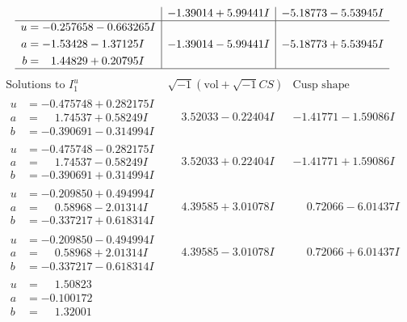 \documentclass[1p]{elsarticle_modified}
\theoremstyle{definition}
\newcommand{\I}{\sqrt{-1}}
\begin{document}
$$\begin{array}{c|c|c}
 & -1.39014 + 5.99441 I & -5.18773 - 5.53945 I \\ \hline\begin{aligned}
u &= -0.257658 - 0.663265 I \\
a &= -1.53428 - 1.37125 I \\
b &= \phantom{-}1.44829 + 0.20795 I\end{aligned}
 & -1.39014 - 5.99441 I & -5.18773 + 5.53945 I\\
 \hline 
 \end{array}$$\newpage$$\begin{array}{c|c|c}  
\text{Solutions to }I^u_{1}& \I (\text{vol} + \sqrt{-1}CS) & \text{Cusp shape}\\
 \hline 
\begin{aligned}
u &= -0.475748 + 0.282175 I \\
a &= \phantom{-}1.74537 + 0.58249 I \\
b &= -0.390691 - 0.314994 I\end{aligned}
 & \phantom{-}3.52033 - 0.22404 I & -1.41771 - 1.59086 I \\ \hline\begin{aligned}
u &= -0.475748 - 0.282175 I \\
a &= \phantom{-}1.74537 - 0.58249 I \\
b &= -0.390691 + 0.314994 I\end{aligned}
 & \phantom{-}3.52033 + 0.22404 I & -1.41771 + 1.59086 I \\ \hline\begin{aligned}
u &= -0.209850 + 0.494994 I \\
a &= \phantom{-}0.58968 - 2.01314 I \\
b &= -0.337217 + 0.618314 I\end{aligned}
 & \phantom{-}4.39585 + 3.01078 I & \phantom{-}0.72066 - 6.01437 I \\ \hline\begin{aligned}
u &= -0.209850 - 0.494994 I \\
a &= \phantom{-}0.58968 + 2.01314 I \\
b &= -0.337217 - 0.618314 I\end{aligned}
 & \phantom{-}4.39585 - 3.01078 I & \phantom{-}0.72066 + 6.01437 I \\ \hline\begin{aligned}
u &= \phantom{-}1.50823\phantom{ +0.000000I} \\
a &= -0.100172\phantom{ +0.000000I} \\
b &= \phantom{-}1.32001\phantom{ +0.000000I}\end{aligned}

\end{array}$$
\end{document}
